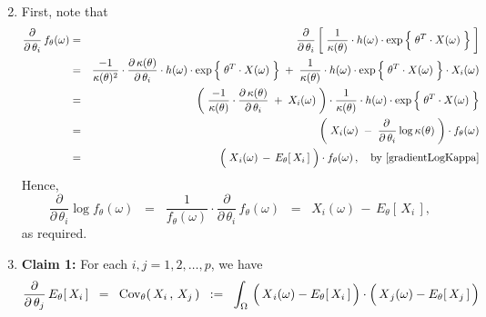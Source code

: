 \begin{enumerate}
\begin{eqnarray*}
	\end{eqnarray*}
\item
	First, note that
	\begin{eqnarray*}
	\dfrac{\partial}{\partial\,\theta_{i}}\,f_{\theta}(\omega)
	& = &
		\dfrac{\partial}{\partial\,\theta_{i}}
		\left[\;
			\dfrac{1}{\kappa(\theta)}
			\cdot
			h(\omega)
			\cdot
			\exp\left\{\; \theta^{T} \!\overset{{\color{white}-}}{\cdot}\! X(\omega) \;\right\}
		\;\right]
	\\
	&=&
		\dfrac{-1}{\kappa(\theta)^{2}}
		\cdot
		\dfrac{\partial\,\kappa(\theta)}{\partial\,\theta_{i}}
		\cdot
		h(\omega)
		\cdot
		\exp\left\{\; \theta^{T} \!\overset{{\color{white}-}}{\cdot}\! X(\omega) \;\right\}
		\; + \;
		\dfrac{1}{\kappa(\theta)}
		\cdot
		h(\omega)
		\cdot
		\exp\left\{\; \theta^{T} \!\overset{{\color{white}-}}{\cdot}\! X(\omega) \;\right\}
		\cdot
		X_{i}(\omega)
	\\
	&=&
		\left(\;
			\dfrac{-1}{\kappa(\theta)}
			\cdot
			\dfrac{\partial\,\kappa(\theta)}{\partial\,\theta_{i}}
			\; + \;
			X_{i}(\omega)
		\;\right)
		\cdot
		\dfrac{1}{\kappa(\theta)}
		\cdot
		h(\omega)
		\cdot
		\exp\left\{\; \theta^{T} \!\overset{{\color{white}-}}{\cdot}\! X(\omega) \;\right\}
	\\
	&=&
		\left(\;
			X_{i}(\omega)
			\; - \;
			\dfrac{\partial\,}{\partial\,\theta_{i}} \log \kappa(\theta)
		\;\right)
		\cdot
		f_{\theta}(\omega)
	\\
	&=&
		\left(\;
			\overset{{\color{white}.}}{X}_{i}(\omega) \, - \, E_{\theta}\!\left[\,X_{i}\,\right]
		\;\right)
		\cdot
		f_{\theta}(\omega)\,,
		\quad
		\textnormal{by \eqref{gradientLogKappa}}
	\end{eqnarray*}
	Hence,
	\begin{equation*}
	\dfrac{\partial}{\partial\,\theta_{i}} \log f_{\theta}(\omega)
	\;\; = \;\;
		\dfrac{1}{f_{\theta}(\omega)}
		\cdot
		\dfrac{\partial}{\partial\,\theta_{i}}\,f_{\theta}(\omega)
	\;\; = \;\;
		X_{i}(\omega) \, - \, E_{\theta}\!\left[\,X_{i}\,\right],
	\end{equation*}
	as required.
\item
	\textbf{Claim 1:}\quad
	For each $i,j = 1, 2, \ldots, p$, we have
	\begin{equation*}
	\dfrac{\partial}{\partial\,\theta_{j}}\,E_{\theta}\!\left[\,X_{i}\,\right]
	\;\; = \;\;
		\Cov_{\theta}\!\left(\,X_{i}\,,\,X_{j}\,\right)
	\;\; := \;\;
		\int_{\Omega}\,
			\left(\,\overset{{\color{white}.}}{X}_{i}(\omega) - E_{\theta}\!\left[\,X_{i}\,\right]\,\right)
			\cdot
			\left(\,\overset{{\color{white}.}}{X}_{j}(\omega) - E_{\theta}\!\left[\,X_{j}\,\right]\,\right)

\end{equation*}
\end{enumerate}

